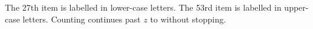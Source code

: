 \documentclass{article}
\begin{document}
The 27th item is labelled  in lower-case letters.
The 53rd item is labelled  in upper-case letters.
Counting continues past $z$ to  without stopping.
\end{document}
